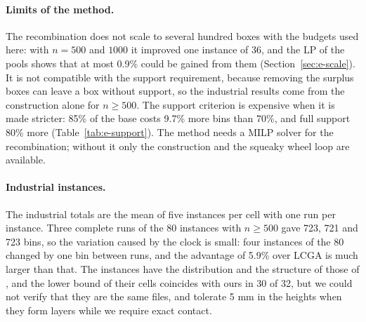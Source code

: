 \paragraph{Limits of the method.}
The recombination does not scale to several hundred boxes with the budgets used here: with $n=500$ and $1000$ it improved one instance of 36, and the LP of the pools shows that at most 0.9\% could be gained from them (Section~\ref{sec:e-scale}). It is not compatible with the support requirement,
because removing the surplus boxes can leave a box without support, so the industrial results come from the construction alone for $n\ge 500$. The support criterion is expensive when it is made stricter: 85\% of the base costs 9.7\% more bins than 70\%, and full support 80\% more (Table~\ref{tab:e-support}).
The method needs a MILP solver for the recombination; without it only the construction and the squeaky wheel loop are available.

\paragraph{Industrial instances.}
The industrial totals are the mean of five instances per cell with one run per instance. Three complete runs of the 80 instances with $n\ge 500$ gave 723, 721 and 723 bins, so the variation caused by the clock is small: four instances of the 80 changed by one bin between runs,
and the advantage of 5.9\% over LCGA is much larger than that. The instances have the distribution and the structure of those of \citet{Elhedhli2019}, and the lower bound of their cells coincides with ours in 30 of 32, but we could not verify that they are the same
files, and \citet{Elhedhli2019} tolerate 5 mm in the heights when they form layers while we require exact contact.

